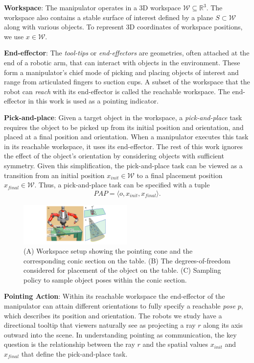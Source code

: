 \documentclass[letterpaper]{article} %
\newcommand{\xinit}{\ensuremath{x_{\textit{init}}}}
\newcommand{\xfinal}{\ensuremath{x_{\textit{final}}}}
\begin{document}
\noindent\textbf{Workspace}: The manipulator operates in a 3D workspace $\mathcal{W} \subseteq \mathbb{R}^3$. The workspace also contains a stable surface of interest defined by a plane $S\subset\mathcal{W}$ along with various objects. To represent 3D coordinates of workspace positions, we use $x\in\mathcal{W}$. 

\noindent\textbf{End-effector}: The \textit{tool-tips} or \textit{end-effectors} are geometries, often attached at the end of a robotic arm, that can interact with objects in the environment. These form a manipulator's chief mode of picking and placing objects of interest and range from articulated fingers to suction cups. A subset of the workspace that the robot can \textit{reach} with its end-effector is called the reachable workspace. The end-effector in this work is used as a pointing indicator.

\noindent\textbf{Pick-and-place}: Given a target object in the workspace, a \textit{pick-and-place} task requires the object to be picked up from its initial position and orientation, and placed at a final position and orientation. When a manipulator executes this task in its reachable workspace, it uses its end-effector. 
The rest of this work ignores the effect of the object's orientation by considering objects with sufficient symmetry. Given this simplification, the pick-and-place task can be viewed as a transition from an initial position $\xinit\in\mathcal{W}$ to a final placement position $\xfinal\in\mathcal{W}$.  Thus, a pick-and-place task can be specified with a tuple
$$ \textit{PAP} = \langle o, \xinit, \xfinal \rangle. $$


\begin{figure}[t]
\centering
\includegraphics[width=0.5\textwidth]{pointing_diagram.pdf}
\caption{(A) Workspace setup showing the pointing cone and the corresponding conic section on the table. (B) The degrees-of-freedom considered for placement of the object on the table. (C) Sampling policy to sample object poses within the conic section.}
    \label{fig:pointing}
\end{figure}

\noindent\textbf{Pointing Action}: Within its reachable workspace the end-effector of the manipulator can attain different orientations to fully specify a reachable \textit{pose} $p$, which describes its position and orientation.  The robots we study have a directional tooltip that viewers naturally see as projecting a ray $r$ along its axis outward into the scene.  In understanding pointing as communication, the key question is the relationship between the ray $r$ and the spatial values $\xinit$ and $\xfinal$ that define the pick-and-place task.
\end{document}
